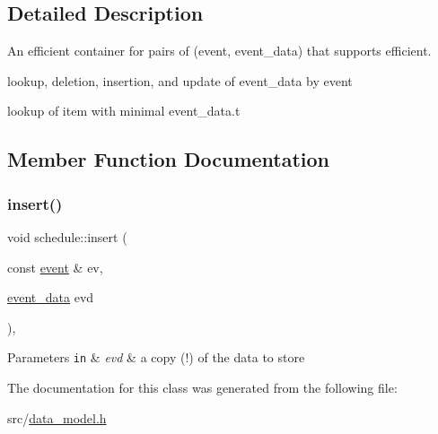 \subsection{Detailed Description}
An efficient container for pairs of (event, event\+\_\+data) that supports efficient. 


\begin{DoxyItemize}
\item lookup, deletion, insertion, and update of event\+\_\+data by event
\item lookup of item with minimal event\+\_\+data.\+t 
\end{DoxyItemize}

\subsection{Member Function Documentation}
\mbox{\label{classschedule_a8a5b3520d96edd10b0c9c62026487997}} 
\subsubsection{\texorpdfstring{insert()}{insert()}}
{\footnotesize\ttfamily void schedule\+::insert (\begin{DoxyParamCaption}\item[{const \hyperlink{structtricl_1_1event}{event} \&}]{ev,  }\item[{\hyperlink{structtricl_1_1event__data}{event\+\_\+data}}]{evd }\end{DoxyParamCaption})\hspace{0.3cm}{\ttfamily [inline]}, {\ttfamily [private]}}


\begin{DoxyParams}[1]{Parameters}
\mbox{\tt in}  & {\em evd} & a copy (!) of the data to store \\
\hline
\end{DoxyParams}


The documentation for this class was generated from the following file\+:\begin{DoxyCompactItemize}
\item 
src/\hyperlink{data__model_8h}{data\+\_\+model.\+h}\end{DoxyCompactItemize}
